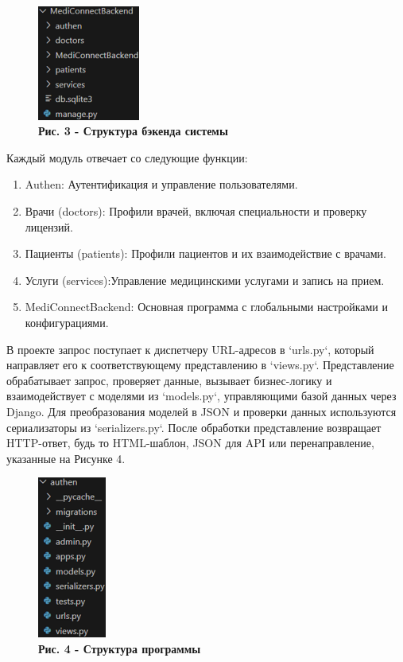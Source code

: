 \begin{figure}[H]
	\centering
	\includegraphics[width=0.3\textwidth]{assets/153}
	\caption*{\bfseries Рис. 3 - Структура бэкенда системы}
\end{figure}

\begin{multicols}{2}

Каждый модуль отвечает со следующие функции:

\begin{enumerate}
\def\labelenumi{\arabic{enumi}.}
\item
  Authen: Аутентификация и управление пользователями.
\item
  Врачи (doctors): Профили врачей, включая специальности и проверку
  лицензий.
\item
  Пациенты (patients): Профили пациентов и их взаимодействие с врачами.
\item
  Услуги (services):Управление медицинскими услугами и запись на прием.
\item
  MediConnectBackend: Основная программа с глобальными настройками и
  конфигурациями.
\end{enumerate}

В проекте запрос поступает к диспетчеру URL-адресов в `urls.py`, который
направляет его к соответствующему представлению в `views.py`.
Представление обрабатывает запрос, проверяет данные, вызывает
бизнес-логику и взаимодействует с моделями из `models.py`, управляющими
базой данных через Django. Для преобразования моделей в JSON и проверки
данных используются сериализаторы из `serializers.py`. После обработки
представление возвращает HTTP-ответ, будь то HTML-шаблон, JSON для API
или перенаправление, указанные на Рисунке 4.
\end{multicols}

\begin{figure}[H]
	\centering
	\includegraphics[width=0.2\textwidth]{assets/154}
	\caption*{\bfseries Рис. 4 - Структура программы}
\end{figure}

